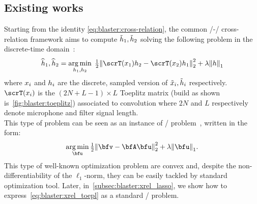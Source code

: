 \subsection{Existing works}\label{subsec:blaster:sota}
Starting from the identity \cref{eq:blaster:cross-relation}, the common \SIMO/-\BCE/ cross-relation framework aims to compute $\tilde{h}_1, \tilde{h}_2$ solving the following problem in the discrete-time domain~:
\begin{equation}
    \label{eq:blaster:xrel_toepl}
    \disFilterHat_1, \disFilterHat_2
    =
    \kargmin_{\disFilter_1, \disFilter_2}
    \;
    \tfrac{1}{2}
    \kvvbar{
        \scrT(\disRecordedSignal_1) \disFilter_2
        -
        \scrT(\disRecordedSignal_2) \disFilter_1
    }_2^2
    +
    \lambda
    \kvvbar{
        \disFilter
    }_1
\end{equation}
where $x_i$ and $h_i$ are the discrete, sampled version of $\tilde{x}_i, \tilde{h}_i$ respectively.
\\$\scrT(\disRecordedSignal_i)$ is the $(2N+L-1) \times L$ Toeplitz matrix (build as shown is~\cref{fig:blaster:toeplitz})
associated to convolution where $2N$ and $L$ respectively denote  microphone and filter signal length.
\\This type of problem can be seen as an instance of \LASSO/ problem~, written in the form:
\begin{equation}\label{eq:blaster:lasso}
    \kargmin_{\bfu} \tfrac{1}{2} \kvvbar{\bfv - \bfA\bfu}_2^2 + \lambda\kvvbar{\bfu}_1
    .
\end{equation}
This type of well-known optimization problem are convex and, despite the non-differentiability of the $\ell_1$-norm, they can be easily tackled by standard optimization tool.
Later, in~\cref{subsec:blaster:xrel_lasso}, we show how to express~\cref{eq:blaster:xrel_toepl} as a standard \LASSO/ problem.


